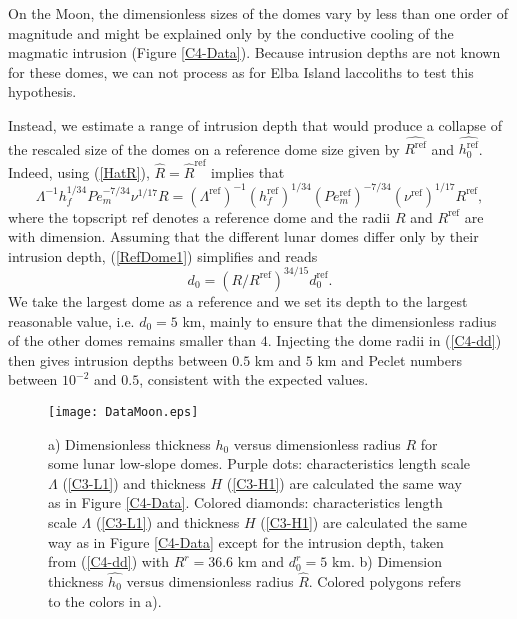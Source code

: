 On the  Moon, the dimensionless sizes  of the domes vary  by less than
one order of  magnitude and might be explained only  by the conductive
cooling  of the  magmatic intrusion  (Figure \ref{C4-Data}).   Because
intrusion depths are not known for  these domes, we can not process as
for Elba Island laccoliths to test this hypothesis.

Instead, we estimate  a range of intrusion depth that  would produce a
collapse of  the rescaled size of  the domes on a  reference dome size
given by $\hat{R^{\text{ref}}}$ and $\hat{h_0^{\text{ref}}}$.  Indeed,
using (\ref{HatR}), $\hat{R}=\hat{R}^{\text{ref}}$ implies that
\begin{equation}
  \Lambda^{-1}h_f^{1/34}Pe_m^{-7/34}\nu^{1/17}R =   \left(\Lambda^{\text{ref}}\right)^{-1}\left(h_f^{\text{ref}}\right)^{1/34}\left(Pe_m^{\text{ref}}\right)^{-7/34}\left(\nu^{\text{ref}}\right)^{1/17}R^{\text{ref}},\label{RefDome1}
\end{equation}
where the topscript ref denotes a reference dome and the radii $R$ and
$R^{\text{ref}}$ are with dimension. Assuming that the different lunar
domes  differ   only  by   their  intrusion   depth,  (\ref{RefDome1})
simplifies and reads
\begin{equation}
  d_0 = \left(R/R^{\text{ref}}\right)^{34/15}d_0^{\text{ref}}.
  \label{C4-dd}
\end{equation}
We take the  largest dome as a  reference and we set its  depth to the
largest reasonable value, i.e.  $d_0=5$  km, mainly to ensure that the
dimensionless  radius of  the other  domes remains  smaller than  $4$.
Injecting the dome radii in  (\ref{C4-dd}) then gives intrusion depths
between $0.5$ km  and $5$ km and Peclet numbers  between $10^{-2}$ and
$0.5$, consistent with the expected values.
\begin{figure}[h!]
  \begin{center}
    \graphicspath{ {/Users/thorey/Documents/These/Projet/Refroidissement/Skin_Model/Figure/Figure_Heating/} }
    \texttt{[image: DataMoon.eps]}
    \caption{  a) Dimensionless  thickness $h_0$  versus dimensionless
      radius  $R$  for  some  lunar  low-slope  domes.   Purple  dots:
      characteristics   length  scale   $\Lambda$  (\ref{C3-L1})   and
      thickness $H$  (\ref{C3-H1}) are calculated  the same way  as in
      Figure \ref{C4-Data}.  Colored  diamonds: characteristics length
      scale  $\Lambda$ (\ref{C3-L1})  and thickness  $H$ (\ref{C3-H1})
      are calculated  the same way  as in Figure  \ref{C4-Data} except
      for  the   intrusion  depth,   taken  from   (\ref{C4-dd})  with
      $R^r  =  36.6$ km  and  $d_0^r=5$  km.  b)  Dimension  thickness
      $\hat{h_0}$  versus  dimensionless  radius  $\hat{R}$.   Colored
      polygons refers to the colors in a).}
    \label{C4-ArrestMoon}
  \end{center}
\end{figure}
